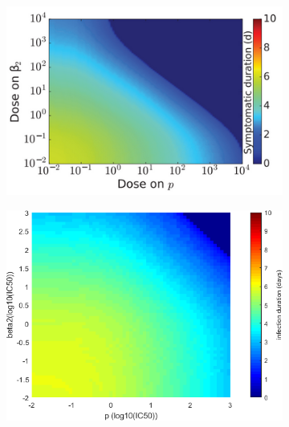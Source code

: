 \documentclass[a4paper,11pt]{article}
\begin{document}
\begin{figure}[H]
    \centering
    \begin{subfigure}{0.4\textwidth}
    
    \includegraphics[width=\textwidth]{MBeta2PT.png}
    \end{subfigure}
    \begin{subfigure}{0.35\textwidth}
    
    \includegraphics[width=\textwidth]{Beta2P_times.png}
    \end{subfigure}
    
    \begin{subfigure}{0.4\textwidth}
    

\end{subfigure}
\end{figure}
\end{document}
